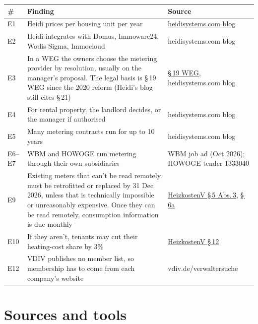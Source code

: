\documentclass[11pt,a4paper]{article}
\begin{document}
\begin{tabularx}{\linewidth}{@{}l L p{4.4cm}@{}}
\toprule
\textbf{\#} & \textbf{Finding} & \textbf{Source} \\
\midrule
E1 & Heidi prices per housing unit per year & \href{https://heidisystems.com/blog/messdienstleister}{heidisystems.com blog} \\
E2 & Heidi integrates with Domus, Immoware24, Wodis Sigma, Immocloud & heidisystems.com blog \\
E3 & In a WEG the owners choose the metering provider by resolution, usually on the manager's
     proposal. The legal basis is \S\,19 WEG since the 2020 reform (Heidi's blog still cites
     \S\,21) & \href{https://www.buzer.de/19_WEG.htm}{\S\,19 WEG}, heidisystems.com blog \\
E4 & For rental property, the landlord decides, or the manager if authorised & heidisystems.com blog \\
E5 & Many metering contracts run for up to 10 years & heidisystems.com blog \\
E6--E7 & WBM and HOWOGE run metering through their own subsidiaries & WBM job ad (Oct 2026);
         HOWOGE tender 1333040 \\
E9 & Existing meters that can't be read remotely must be retrofitted or replaced by
     31 Dec 2026, unless that is technically impossible or unreasonably expensive. Once they can
     be read remotely, consumption information is due monthly &
     \href{https://www.gesetze-im-internet.de/heizkostenv/__5.html}{HeizkostenV \S\,5 Abs.\,3},
     \href{https://www.gesetze-im-internet.de/heizkostenv/__6a.html}{\S\,6a} \\
E10 & If they aren't, tenants may cut their heating-cost share by 3\% &
      \href{https://www.gesetze-im-internet.de/heizkostenv/__12.html}{HeizkostenV \S\,12} \\
E12 & VDIV publishes no member list, so membership has to come from each company's website &
      vdiv.de/verwaltersuche \\
\bottomrule
\end{tabularx}

\section{Sources and tools}
\end{document}
